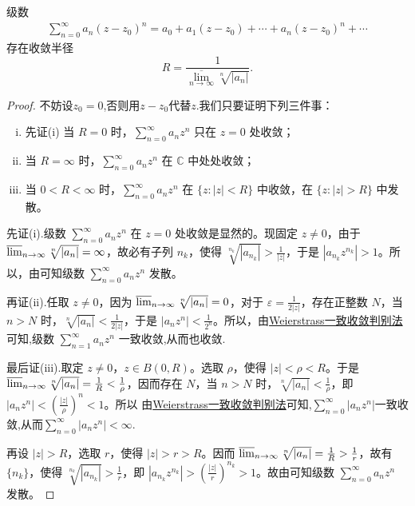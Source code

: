 \documentclass[../../main.tex]{subfiles}%
\begin{document}
\begin{theorem}\label{theorem:Cauchy-Hadamard收敛半径公式}
级数\begin{align*}
\sum_{n=0}^{\infty} a_n(z - z_0)^n = a_0 + a_1(z - z_0) + \cdots  + a_n(z - z_0)^n + \cdots 
\end{align*}
存在收敛半径
\[
R=\frac{1}{\underset{n\rightarrow \infty}{\overline{\lim }}\sqrt[n]{|a_n|}}.
\]
\end{theorem}
\begin{proof}
不妨设$z_0=0$,否则用$z-z_0$代替$z$.我们只要证明下列三件事：
\begin{enumerate}[(i)]
\item 先证(i) 当 \( R = 0 \) 时，\( \sum_{n=0}^{\infty} a_n z^n \) 只在 \( z = 0 \) 处收敛；

\item 当 \( R = \infty \) 时，\( \sum_{n=0}^{\infty} a_n z^n \) 在 \( \mathbb{C} \) 中处处收敛；

\item 当 \( 0 < R < \infty \) 时，\( \sum_{n=0}^{\infty} a_n z^n \) 在 \( \{z : |z| < R\} \) 中收敛，在 \( \{z : |z| > R\} \) 中发散。
\end{enumerate}
先证(i).级数 \( \sum_{n=0}^{\infty} a_n z^n \) 在 \( z = 0 \) 处收敛是显然的。现固定 \( z \neq 0 \)，由于 \( \varlimsup_{n \to \infty} \sqrt[n]{|a_n|} = \infty \)，故必有子列 \( n_k \)，使得 \( \sqrt[n_k]{|a_{n_k}|} > \frac{1}{|z|} \)，于是 \( |a_{n_k} z^{n_k}| > 1 \)。所以，由可知级数 \( \sum_{n=0}^{\infty} a_n z^n \) 发散。

再证(ii).任取 \( z \neq 0 \)，因为 \( \varlimsup_{n \to \infty} \sqrt[n]{|a_n|} = 0 \)，对于 \( \varepsilon = \frac{1}{2|z|} \)，存在正整数 \( N \)，当 \( n > N \) 时，\( \sqrt[n]{|a_n|} < \frac{1}{2|z|} \)，于是 \( |a_n z^n| < \frac{1}{2^n} \)。所以，由\hyperref[theorem:Weierstrass一致收敛判别法]{Weierstrass一致收敛判别法}可知,级数 \( \sum_{n=1}^{\infty} a_n z^n \) 一致收敛,从而也收敛.

最后证(iii).取定 \( z \neq 0 \)，\( z \in B(0, R) \)。选取 \( \rho \)，使得 \( |z| < \rho < R \)。于是 \( \varlimsup_{n \to \infty} \sqrt[n]{|a_n|} = \frac{1}{R} < \frac{1}{\rho} \)，因而存在 \( N \)，当 \( n > N \) 时，\( \sqrt[n]{|a_n|} < \frac{1}{\rho} \)，即 \( |a_n z^n| < \left( \frac{|z|}{\rho} \right)^n<1 \)。所以 由\hyperref[theorem:Weierstrass一致收敛判别法]{Weierstrass一致收敛判别法}可知,\( \sum_{n=0}^{\infty} |a_n z^n|\)一致收敛,从而\( \sum_{n=0}^{\infty} |a_n z^n| < \infty \).

再设 \( |z| > R \)，选取 \( r \)，使得 \( |z| > r > R \)。因而 \( \varlimsup_{n \to \infty} \sqrt[n]{|a_n|} = \frac{1}{R} > \frac{1}{r} \)，故有 \( \{n_k\} \)，使得 \( \sqrt[n_k]{|a_{n_k}|} > \frac{1}{r} \)，即 \( |a_{n_k} z^{n_k}| > \left( \frac{|z|}{r} \right)^{n_k} > 1 \)。故由可知级数 \( \sum_{n=0}^{\infty} a_n z^n \) 发散。
\end{proof}
\end{document}
